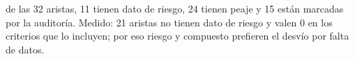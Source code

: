 {de las 32 aristas, 11 tienen dato de riesgo, 24 tienen peaje y 15 están marcadas por la auditoría.}
{Medido: 21 aristas no tienen dato de riesgo y valen 0 en los criterios que lo incluyen; por eso riesgo y compuesto prefieren el desvío por falta de datos.}
